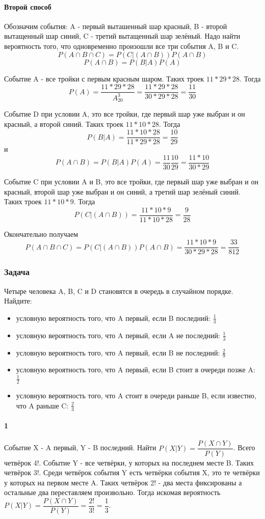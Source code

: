 \documentclass[a4paper,12pt]{article}
\begin{document}
\paragraph{Второй способ}
Обозначим события: A - первый выташенный шар красный, B - второй вытащенный шар синий, C - третий вытащенный шар зелёный. Надо найти вероятность того, что одновременно произошли все три события A, B и C.
\[P(A\cap B \cap C)=P(C|(A \cap B))P(A \cap B)\]
\[P(A \cap B)=P(B|A)P(A)\]

Событие A - все тройки с первым красным шаром. Таких троек \(11*29*28\). Тогда \[P(A)=\dfrac{11*29*28}{A_{20}^3}=\dfrac{11*29*28}{30*29*28}=\dfrac{11}{30}\]

Событие D при условии A, это все тройки, где первый шар уже выбран и он красный, а второй синий. Таких троек \(11*10*28\). Тогда
\[P(B|A)=\dfrac{11*10*28}{11*29*28}=\dfrac{10}{29}\]
и
\[P(A \cap B)=P(B|A)P(A)=\dfrac{11}{30}\dfrac{10}{29}=\dfrac{11*10}{30*29}\]

Событие C при условии A и B, это все тройки, где первый шар уже выбран и он красный, второй шар уже выбран и он синий, а третий шар зелёный синий. Таких троек \(11*10*9\). Тогда
\[P(C|(A \cap B))=\dfrac{11*10*9}{11*10*28}=\dfrac{9}{28}\]

Окончательно получаем 
\[P(A\cap B \cap C)=P(C|(A \cap B))P(A \cap B)=\dfrac{11*10*9}{30*29*28}=\dfrac{33}{812}\]

\subsubsection*{Задача}
Четыре человека A, B, C и D становятся в очередь в случайном порядке. Найдите:
\begin{itemize}
	\item условную вероятность того, что A первый, если B последний: \(\frac{1}{3}\)
    \item условную вероятность того, что A первый, если A не последний: \(\frac{1}{3}\)
	\item условную вероятность того, что A первый, если B не последний: \(\frac{2}{9}\)
	\item условную вероятность того, что A первый, если B стоит в очереди позже A:  \(\frac{1}{2}\)
	\item условную вероятность того, что A стоит в очереди раньше B, если известно, что A раньше C:  \(\frac{2}{3}\)
\end{itemize}
\paragraph{1}
Событие X - A первый, Y - B последний. Найти \(P(X|Y)=\dfrac{P(X\cap Y)}{P(Y)}\). Всего четвёрок 4!. Событие Y - все четвёрки, у которых на последнем месте B. Таких четвёрок 3!. Среди четвёрок события Y есть четвёрки события X, это те четвёрки у которых на первом месте A. Таких четвёрок 2! - два места фиксированы а остальные два переставляем произвольно. Тогда искомая вероятность \(P(X|Y)=\dfrac{P(X\cap Y)}{P(Y)}=\dfrac{2!}{3!}=\dfrac{1}{3}\).
\end{document}
